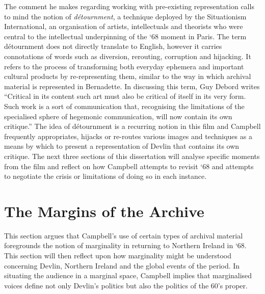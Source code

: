 \documentclass[12pt]{article}
\begin{document}
The comment he makes regarding working with pre-existing representation calls to mind the notion of \textit{d\'{e}tournment}, a technique deployed by the Situationism International, an organisation of artists, intellectuals and theorists who were central to the intellectual underpinning of the `68 moment in Paris. The term d\'{e}tournment does not directly translate to English, however it carries connotations of words such as diversion, rerouting, corruption and hijacking\cite[pp~36]{Ford:2005aa}. It refers to the process of transforming both everyday ephemera and important cultural products by re-representing them, similar to the way in which archival material is represented in Bernadette. In discussing this term, Guy Debord writes ``Critical in its content such art must also be critical of itself in its very form. Such work is a sort of communication that, recognising the limitations of the specialised sphere of hegemonic communication, will now contain its own critique.''\cite[p~95]{Ford:2005aa} The idea of d\'{e}tournment is a recurring notion in this film and Campbell frequently appropriates, hijacks or re-routes various images and techniques as a means by which to present a representation of Devlin that contains its own critique. The next three sections of this dissertation will analyse specific moments from the film and reflect on how Campbell attempts to revisit `68 and attempts to negotiate the crisis or limitations of doing so in each instance. 

\section{The Margins of the Archive}

This section argues that Campbell's use of certain types of archival material foregrounds the notion of marginality in returning to Northern Ireland in `68. This section will then reflect upon how marginality might be understood concerning Devlin, Northern Ireland and the global events of the period. In situating the audience in a marginal space, Campbell implies that marginalised voices define not only Devlin's politics but also the politics of the 60's proper.  
\end{document}
